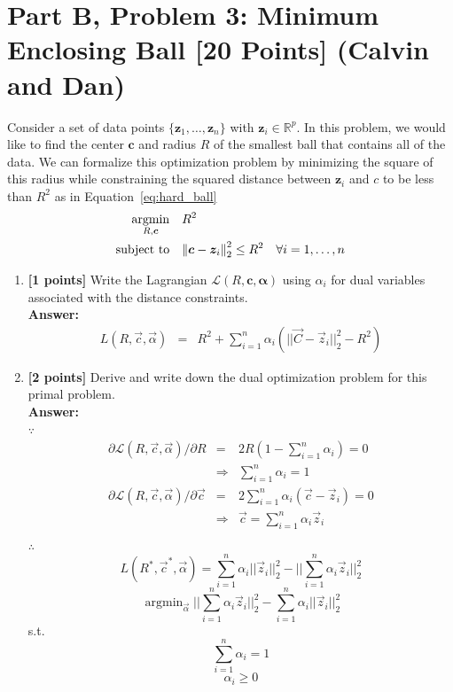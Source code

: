 \documentclass{article}
\DeclareMathOperator*{\argmin}{\mathrm{argmin}}
\def\R{\mathbb{R}}
\newcommand{\st}{\mathop{\mathrm{subject\,\,to}}}
\begin{document}
\newpage


\section*{Part B, Problem 3: Minimum Enclosing Ball [20 Points] (Calvin and Dan)}

Consider a set of data points $\{\boldsymbol{z}_1,\dotsc,\boldsymbol{z}_n\}$ with $\boldsymbol{z}_i \in \R^p$. In this problem, we would like to find the center $\boldsymbol{c}$ and radius $R$ of the smallest ball that contains all of the data. We can formalize this optimization problem by minimizing the square of this radius while constraining the squared distance between $\boldsymbol{z}_i$ and $c$ to be less than $R^2$ as in Equation~\ref{eq:hard_ball}
\begin{align}
\argmin_{R,\boldsymbol{c}}&\quad R^{2} \nonumber \\ \st&\quad\norm{\boldsymbol{c}-\boldsymbol{z}_{i}}_{2}^{2}\leq R^{2}\quad \forall i=1,\dotsc,n \label{eq:hard_ball} 
\end{align}
\begin{enumerate}
\item \textbf{[1 points]} Write the Lagrangian $\mathcal{L}(R, \boldsymbol{c}, \boldsymbol{\alpha})$ using $\alpha_i$ for dual variables associated with the distance constraints.\\
\textbf{Answer:}\\
\begin{equation}
\nonumber
\begin{array}{rcl}
L(R,\vec{c},\vec{\alpha}) & = & R^2 + \sum_{i=1}^n\alpha_i(||\vec{C}-\vec{z}_i||_2^2-R^2)
\end{array}
\end{equation}

\item \textbf{[2 points]} Derive and write down the dual optimization problem for this primal problem.\\
\textbf{Answer:}\\
$\because$
\begin{equation}
\nonumber
\begin{array}{rcl}
\partial \mathcal{L}(R,\vec{c},\vec{\alpha}) / \partial R & = & 2R(1 - \sum_{i=1}^n\alpha_i) = 0 \\
			& \Rightarrow & \sum_{i=1}^n\alpha_i=1 \\
\partial \mathcal{L}(R,\vec{c},\vec{\alpha}) / \partial \vec{c} & = & 2\sum_{i=1}^n\alpha_i(\vec{c}-\vec{z}_i) = 0 \\
			& \Rightarrow & \vec{c}=\sum_{i=1}^n\alpha_i\vec{z}_i \\
\end{array}
\end{equation}
$\therefore$
$$L(R^*,\vec{c}^*,\vec{\alpha}) = \sum_{i=1}^n \alpha_i||\vec{z}_i||_2^2 - ||\sum_{i=1}^n\alpha_i\vec{z}_i||_2^2$$
$$\argmin_{\vec{\alpha}} ||\sum_{i=1}^n\alpha_i\vec{z}_i||_2^2 - \sum_{i=1}^n \alpha_i||\vec{z}_i||_2^2$$
s.t.
$$\sum_{i=1}^n\alpha_i=1$$
$$\alpha_i \geq 0$$

\end{enumerate}
 
\end{document}
